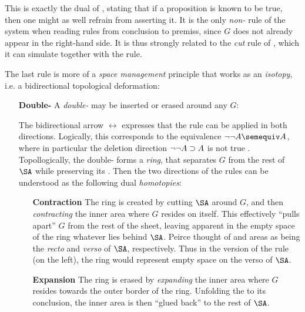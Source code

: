 \begin{scope}
\begin{itemize}
    This is exactly the dual of , stating that if a proposition
    is known to be true, then one might as well refrain from asserting it. It is
    the only \emph{non-} rule of the system when reading rules from
    conclusion to premiss, since $G$ does not already appear in the right-hand
    side. It is thus strongly related to the \emph{cut} rule of , which it can simulate together with the  rule.
\end{itemize}
The last rule is more of a \emph{space management} principle that works as an
\emph{isotopy}, i.e. a bidirectional topological deformation:
\begin{itemize}
  \item[\textbf{Double-\kl{cut}}]
    A \emph{double-} may be inserted or erased around any  $G$:
    The bidirectional arrow $\leftrightarrow$ expresses that the rule can be
    applied in both directions.
    Logically, this corresponds to the  equivalence $\neg\neg A
    \semequiv A$, where in particular the deletion direction $\neg\neg A \supset A$
    is not true . Topollogically, the double- forms a
    \emph{ring}, that separates $G$ from the rest of $\SA$ while preserving its
    . Then the two directions of the rules can be understood as the
    following dual \emph{homotopies}:
    \begin{itemize}
      \item[\textbf{Contraction}] The ring is created by cutting $\SA$ around
      $G$, and then \emph{contracting} the inner area where $G$ resides on
      itself. This effectively ``pulls apart'' $G$ from the rest of the sheet,
      leaving apparent in the empty space of the ring whatever lies behind
      $\SA$. Peirce thought of  and  areas as being the
      \emph{recto} and \emph{verso} of $\SA$, respectively. Thus in the 
      version of the rule (on the left), the ring would represent  empty
      space on the verso of $\SA$.
      \item[\textbf{Expansion}] The ring is erased by \emph{expanding} the inner
      area where $G$ resides towards the outer border of the ring. Unfolding the
       to its conclusion, the inner area is then ``glued back'' to the
      rest of $\SA$.
    \end{itemize}
\end{itemize}


\end{scope}
